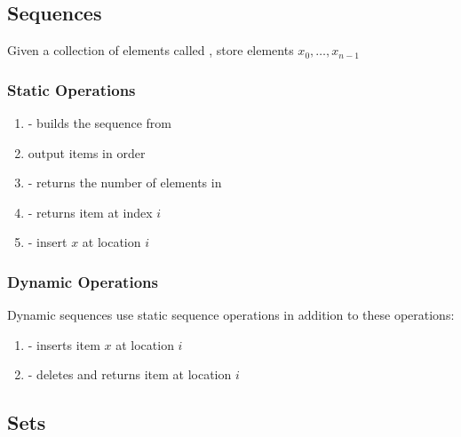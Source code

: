 \documentclass{article}
\begin{document}
    \subsection{Sequences}
        Given a collection of elements called , store elements $x_0, \dots, x_{n-1}$
        \subsubsection{Static Operations}
            \begin{enumerate}
                \item {} - builds the sequence from 
                \item {} output items in order
                \item {} -  returns the number of elements in 
                \item {} - returns item at index $i$
                \item {} - insert $x$ at location $i$ 
            \end{enumerate}
        \subsubsection{Dynamic Operations}
        Dynamic sequences use static sequence operations in addition to these operations:
            \begin{enumerate}
                \item {} - inserts item $x$ at location $i$
                \item {} - deletes and returns item at location $i$
            \end{enumerate}
    \subsection{Sets}
\end{document}
